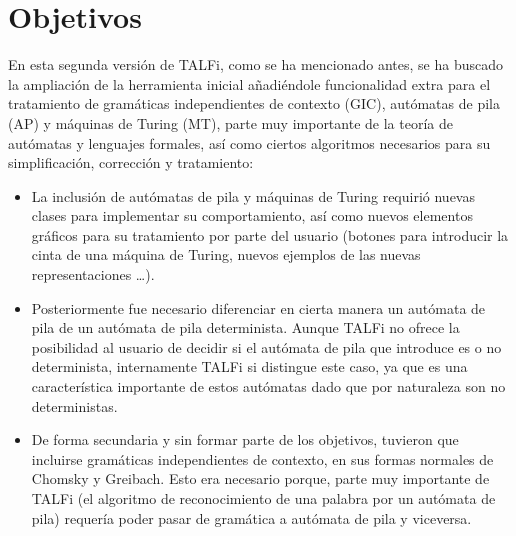 \documentclass[12pt,a4paper,spanish]{book}
\begin{document}
\chapter{Objetivos}
En esta segunda versi\'on de TALFi, como se ha mencionado antes, se ha buscado la ampliaci\'on de la herramienta inicial a\~nadi\'endole funcionalidad extra para el tratamiento de gram\'aticas independientes de contexto (GIC), aut\'omatas de pila (AP) y m\'aquinas de Turing (MT), parte muy importante de la teor\'ia de aut\'omatas y lenguajes formales, as\'i como ciertos algoritmos necesarios para su simplificaci\'on, correcci\'on y tratamiento:
\begin{itemize}
\item La inclusi\'on de aut\'omatas de pila y m\'aquinas de Turing requiri\'o nuevas clases para implementar su comportamiento, as\'i como nuevos elementos gr\'aficos para su tratamiento por parte del usuario (botones para introducir la cinta de una m\'aquina de Turing, nuevos ejemplos de las nuevas representaciones \ldots).
\item Posteriormente fue necesario diferenciar en cierta manera un aut\'omata de pila de un aut\'omata de pila determinista. Aunque TALFi no ofrece la posibilidad al usuario de decidir si el aut\'omata de pila que introduce es o no determinista, internamente TALFi si distingue este caso, ya que es una caracter\'istica importante de estos aut\'omatas dado que por naturaleza son no deterministas.
\item De forma secundaria y sin formar parte de los objetivos, tuvieron que incluirse gram\'aticas independientes de contexto, en sus formas normales de Chomsky y Greibach.
Esto era necesario porque, parte muy importante de TALFi (el algoritmo de reconocimiento de una palabra por un aut\'omata de pila) requer\'ia poder pasar de gram\'atica a aut\'omata de pila y viceversa.


\end{itemize}
\end{document}
